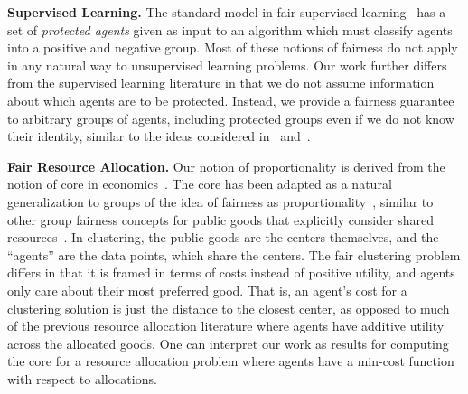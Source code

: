 \textbf{Supervised Learning.} The standard model in fair supervised learning~\cite{awareness, kleinberg2, kleinberg1, groupEnvyFree, mistreatment} has a set of \textit{protected agents} given as input to an algorithm which must classify agents into a positive and negative group. Most of these notions of fairness do not apply in any natural way to unsupervised learning problems. Our work further differs from the supervised learning literature in that we do not assume information about which agents are to be protected. Instead, we provide a fairness guarantee to arbitrary groups of agents, including protected groups even if we do not know their identity, similar to the ideas considered in~\cite{subgroup} and~\cite{fairLossMinimization}.

\textbf{Fair Resource Allocation.} Our notion of proportionality is derived from the notion of core in economics~\cite{scarfCore, lindahlCore}. The core has been adapted as a natural generalization to groups of the idea of fairness as proportionality~\cite{coreWINE16, coreEC18}, similar to other group fairness concepts for public goods that explicitly consider shared resources~\cite{fairPublicDecisions, justifiedRepresentation}. In clustering, the public goods are the centers themselves, and the ``agents'' are the data points, which share the centers. The fair clustering problem differs in that it is framed in terms of costs instead of positive utility, and agents only care about their most preferred good. That is, an agent's cost for a clustering solution is just the distance to the closest center, as opposed to much of the previous resource allocation literature where agents have additive utility across the allocated goods. One can interpret our work as results for computing the core for a resource allocation problem where agents have a min-cost function with respect to allocations.

